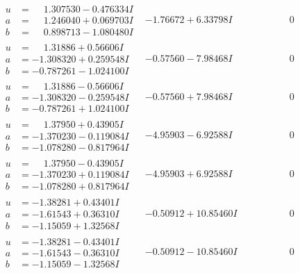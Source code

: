\documentclass[1p]{elsarticle_modified}
\theoremstyle{definition}
\begin{document}
$$\begin{array}{c|c|c}
\begin{aligned}
u &= \phantom{-}1.307530 - 0.476334 I \\
a &= \phantom{-}1.246040 + 0.069703 I \\
b &= \phantom{-}0.898713 - 1.080480 I\end{aligned}
 & -1.76672 + 6.33798 I & \phantom{-0.000000 } 0 \\ \hline\begin{aligned}
u &= \phantom{-}1.31886 + 0.56606 I \\
a &= -1.308320 + 0.259548 I \\
b &= -0.787261 - 1.024100 I\end{aligned}
 & -0.57560 - 7.98468 I & \phantom{-0.000000 } 0 \\ \hline\begin{aligned}
u &= \phantom{-}1.31886 - 0.56606 I \\
a &= -1.308320 - 0.259548 I \\
b &= -0.787261 + 1.024100 I\end{aligned}
 & -0.57560 + 7.98468 I & \phantom{-0.000000 } 0 \\ \hline\begin{aligned}
u &= \phantom{-}1.37950 + 0.43905 I \\
a &= -1.370230 - 0.119084 I \\
b &= -1.078280 - 0.817964 I\end{aligned}
 & -4.95903 - 6.92588 I & \phantom{-0.000000 } 0 \\ \hline\begin{aligned}
u &= \phantom{-}1.37950 - 0.43905 I \\
a &= -1.370230 + 0.119084 I \\
b &= -1.078280 + 0.817964 I\end{aligned}
 & -4.95903 + 6.92588 I & \phantom{-0.000000 } 0 \\ \hline\begin{aligned}
u &= -1.38281 + 0.43401 I \\
a &= -1.61543 + 0.36310 I \\
b &= -1.15059 + 1.32568 I\end{aligned}
 & -0.50912 + 10.85460 I & \phantom{-0.000000 } 0 \\ \hline\begin{aligned}
u &= -1.38281 - 0.43401 I \\
a &= -1.61543 - 0.36310 I \\
b &= -1.15059 - 1.32568 I\end{aligned}
 & -0.50912 - 10.85460 I & \phantom{-0.000000 } 0 \\ \hline\begin{aligned}

\end{aligned}
\end{array}$$
\end{document}

